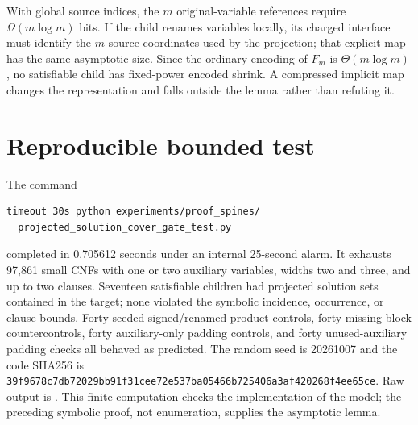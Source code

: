 \documentclass[11pt]{article}
\begin{document}
With global source indices, the $m$ original-variable references require
$\Omega(m\log m)$ bits.  If the child renames variables locally, its charged
interface must identify the $m$ source coordinates used by the projection;
that explicit map has the same asymptotic size.  Since the ordinary encoding
of $F_m$ is $\Theta(m\log m)$, no satisfiable child has fixed-power encoded
shrink.  A compressed implicit map changes the representation and falls
outside the lemma rather than refuting it.

\section{Reproducible bounded test}
The command
\begin{verbatim}
timeout 30s python experiments/proof_spines/
  projected_solution_cover_gate_test.py
\end{verbatim}
completed in 0.705612 seconds under an internal 25-second alarm.  It exhausts
97,861 small CNFs with one or two auxiliary variables, widths two and three,
and up to two clauses.  Seventeen satisfiable children had projected solution
sets contained in the target; none violated the symbolic incidence,
occurrence, or clause bounds.  Forty seeded signed/renamed product controls,
forty missing-block countercontrols, forty auxiliary-only padding controls,
and forty unused-auxiliary padding checks all behaved as predicted.  The
random seed is 20261007 and the code SHA256 is
\texttt{39f9678c7db72029bb91f31cee72e537ba05466b725406a3af420268f4ee65ce}.
Raw output is
.
This finite computation checks the implementation of the model; the preceding
symbolic proof, not enumeration, supplies the asymptotic lemma.
\end{document}
